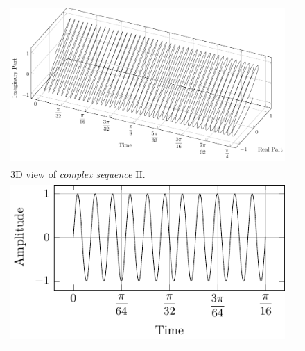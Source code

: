 \documentclass[../../course]{subfiles}
\begin{document}
\begin{figure} [H]

    \renewcommand{\arraystretch}{0.75}
    \centering
    \begin{NiceTabularX} {\textwidth} {
            *{2}{>{\centering\arraybackslash}X}
        }

         {
             {
                \includegraphics[height = \textheight] {tikzpics/plotComplexH.pdf}
            }
        }

        &
        \\

         {
            \vbox{
                 {3D view of \emph{complex sequence} H.}
                \label{plt:cmplxH}
            }
        }

        &
        \\

         {
             {
                \includegraphics[height = \textheight] {tikzpics/plotShortX3.pdf}
            }
        }

        &


\end{NiceTabularX}
\end{figure}
\end{document}
